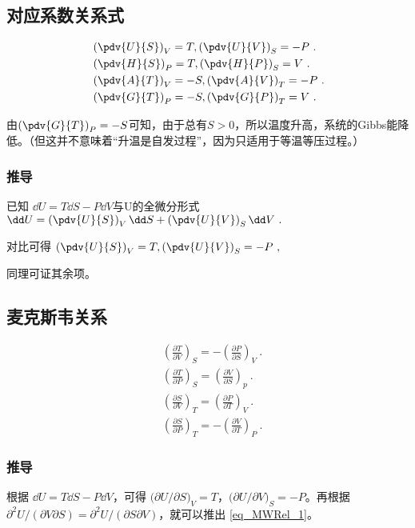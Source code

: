 \subsection{对应系数关系式}
\begin{align}
&\left(\pdv{U}{S}\right)_V=T, \left(\pdv{U}{V}\right)_S=-P~.
\\
&\left(\pdv{H}{S}\right)_P=T, \left(\pdv{H}{P}\right)_S=V~.
\\
&\left(\pdv{A}{T}\right)_V=-S, \left(\pdv{A}{V}\right)_T=-P~.
\\
&\left(\pdv{G}{T}\right)_P=-S, \left(\pdv{G}{P}\right)_T=V~.
\end{align}

由$\left(\pdv{G}{T}\right)_P=-S$可知，由于总有$S>0$，所以温度升高，系统的Gibbs能降低。（但这并不意味着“升温是自发过程”，因为只适用于等温等压过程。）

\subsubsection{推导}
已知 $\dd U = T \dd S - P \dd V$与U的全微分形式 $\dd U = \left(\pdv{U}{S}\right)_V \dd S+\left(\pdv{U}{V}\right)_S \dd V~.$

对比可得 $\left(\pdv{U}{S}\right)_V=T, \left(\pdv{U}{V}\right)_S=-P~,$

同理可证其余项。

\subsection{麦克斯韦关系}

\begin{align}
&\left(\frac{\partial T}{\partial V}\right)_S=-\left(\frac{\partial P}{\partial S}\right)_V\label{eq_MWRel_1}~.
\\
&\left(\frac{\partial T}{\partial P}\right)_S=\left(\frac{\partial V}{\partial S}\right)_p~.
\\
&\left(\frac{\partial S}{\partial V}\right)_T=\left(\frac{\partial P}{\partial T}\right)_V~.
\\
&\left(\frac{\partial S}{\partial P}\right)_T=-\left(\frac{\partial V}{\partial T}\right)_P~.
\end{align}

\subsubsection{推导}
根据 $\dd U=T\dd S-P\dd V$，可得 $\Big(\partial U/\partial S\Big)_V=T$，$\Big(\partial U/\partial V\Big)_S=-P$。再根据 $\partial^2 U/(\partial V\partial S)=\partial^2 U/(\partial S\partial V)$，就可以推出 \autoref{eq_MWRel_1}。

